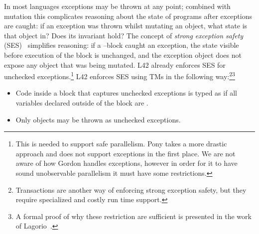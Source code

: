 {}\label{s:exceptions}
In most languages exceptions may be thrown at any point; combined with mutation this complicates reasoning about the state of programs after exceptions are caught: if an exception was thrown whilst mutating an object, what state is that object in? Does its invariant hold?
The concept of \emph{strong exception safety} (SES)~\cite{Abrahams2000,JOT:issue_2011_01/article1} simplifies reasoning:
if a \Q@try@--\Q@catch@ block caught an exception, the state visible before execution of the \Q@try@ block is unchanged, and the exception object does not expose any object that was being mutated.
L42 already enforces SES for unchecked exceptions.\footnote{%
This is needed to support safe parallelism. Pony takes a more drastic approach and does not support exceptions in the first place. 
We are not aware of how Gordon \etal handles exceptions, however in order for it to have sound unobservable parallelism it must have some restrictions.%
}
L42 enforces SES using TMs in the following way:\footnote{Transactions are another way of enforcing strong exception safety, but they require specialized and costly run time support.}\footnote{A formal proof of why these restriction are sufficient is presented in the work of Lagorio~\cite{JOT:issue_2011_01/article1}.}
\SSI\begin{itemize}
\item Code inside a \Q@try@ block that captures unchecked exceptions is typed as if all \Q@mut@ variables declared outside of the block are \Q@read@.
\item Only \Q@imm@ objects may be thrown as unchecked exceptions.
\end{itemize} 
